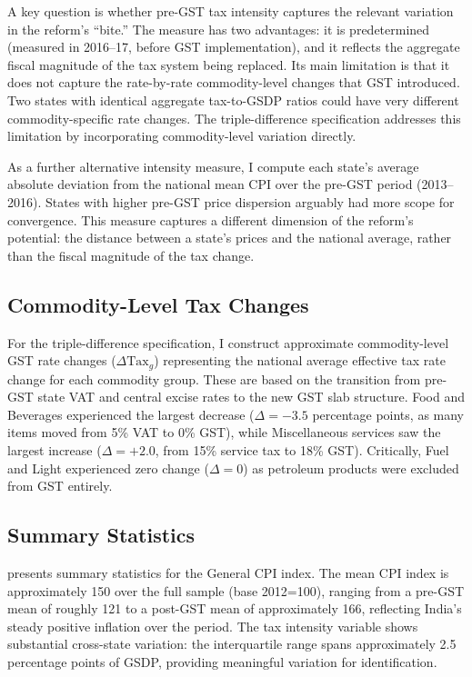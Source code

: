 \documentclass[12pt]{article}
\begin{document}
A key question is whether pre-GST tax intensity captures the relevant variation in the reform's ``bite.'' The measure has two advantages: it is predetermined (measured in 2016--17, before GST implementation), and it reflects the aggregate fiscal magnitude of the tax system being replaced. Its main limitation is that it does not capture the rate-by-rate commodity-level changes that GST introduced. Two states with identical aggregate tax-to-GSDP ratios could have very different commodity-specific rate changes. The triple-difference specification addresses this limitation by incorporating commodity-level variation directly.

As a further alternative intensity measure, I compute each state's average absolute deviation from the national mean CPI over the pre-GST period (2013--2016). States with higher pre-GST price dispersion arguably had more scope for convergence. This measure captures a different dimension of the reform's potential: the distance between a state's prices and the national average, rather than the fiscal magnitude of the tax change.

\subsection{Commodity-Level Tax Changes}

For the triple-difference specification, I construct approximate commodity-level GST rate changes ($\Delta\text{Tax}_g$) representing the national average effective tax rate change for each commodity group. These are based on the transition from pre-GST state VAT and central excise rates to the new GST slab structure. Food and Beverages experienced the largest decrease ($\Delta = -3.5$ percentage points, as many items moved from 5\% VAT to 0\% GST), while Miscellaneous services saw the largest increase ($\Delta = +2.0$, from 15\% service tax to 18\% GST). Critically, Fuel and Light experienced zero change ($\Delta = 0$) as petroleum products were excluded from GST entirely.

\subsection{Summary Statistics}

 presents summary statistics for the General CPI index. The mean CPI index is approximately 150 over the full sample (base 2012=100), ranging from a pre-GST mean of roughly 121 to a post-GST mean of approximately 166, reflecting India's steady positive inflation over the period. The tax intensity variable shows substantial cross-state variation: the interquartile range spans approximately 2.5 percentage points of GSDP, providing meaningful variation for identification.
\end{document}
